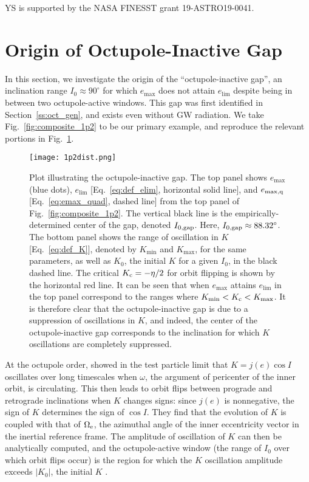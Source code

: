 \documentclass[
        fleqn,
        usenatbib,
    ]{mnras}
\newcommand*{\abs}[1]{\left|#1\right|}
\newlength{\colummwidth}
\begin{document}
YS is supported by the NASA FINESST grant 19-ASTRO19-0041.%




\clearpage
\onecolumn

\appendix

\section{Origin of Octupole-Inactive Gap}\label{app:gap}

In this section, we investigate the origin of the ``octupole-inactive gap'', an
inclination range $I_0 \approx 90^\circ$ for which $e_{\max}$ does not attain
$e_{\lim}$ despite being in between two octupole-active windows. This gap was
first identified in Section~\ref{ss:oct_gen}, and exists even without GW
radiation. We take Fig.~\ref{fig:composite_1p2} to be our primary example, and
reproduce the relevant portions in Fig.~\ref{fig:kdist}.

\begin{figure}
    \centering
    \texttt{[image: 1p2dist.png]}
    \caption{Plot illustrating the octupole-inactive gap. The top panel shows
    $e_{\max}$ (blue dots), $e_{\lim}$ [Eq.~\eqref{eq:def_elim}, horizontal
    solid line], and $e_{\rm \max, q}$ [Eq.~\eqref{eq:emax_quad}, dashed line]
    from the top panel of Fig.~\ref{fig:composite_1p2}. The vertical black line
    is the empirically-determined center of the gap, denoted $I_{\rm 0, gap}$.
    Here, $I_{\rm 0, gap} \approx 88.32^\circ$. The bottom panel shows the range of
    oscillation in $K$ [Eq.~\eqref{eq:def_K}], denoted by $K_{\min}$ and
    $K_{\max}$, for the same parameters, as well as $K_0$, the initial $K$ for a
    given $I_0$, in the black dashed line. The critical $K_{\rm c} = -\eta / 2$
    for orbit flipping is shown by the horizontal red line. It can be seen that
    when $e_{\max}$ attains $e_{\lim}$ in the top panel correspond to the ranges
    where $K_{\min} < K_{\rm c} < K_{\max}$. It is therefore clear that the
    octupole-inactive gap is due to a suppression of oscillations in $K$, and
    indeed, the center of the octupole-inactive gap corresponds to the
    inclination for which $K$ oscillations are completely suppressed.
    }\label{fig:kdist}
\end{figure}

At the octupole order, \citet{katz2011long} showed in the test particle limit
that $K = j(e) \cos I$ oscillates over long timescales when $\omega$, the
argument of pericenter of the inner orbit, is circulating. This then leads to
orbit flips between prograde and retrograde inclinations when $K$ changes signs:
since $j(e)$ is nonnegative, the sign of $K$ determines the sign of $\cos I$.
They find that the evolution of $K$ is coupled with that of $\Omega_{\rm e}$,
the azimuthal angle of the inner eccentricity vector in the inertial reference
frame. The amplitude of oscillation of $K$ can then be analytically computed,
and the octupole-active window (the range of $I_0$ over which orbit flips occur)
is the region for which the $K$ oscillation amplitude exceeds $\abs{K_0}$, the
initial $K$ \citep{katz2011long}.
\end{document}
